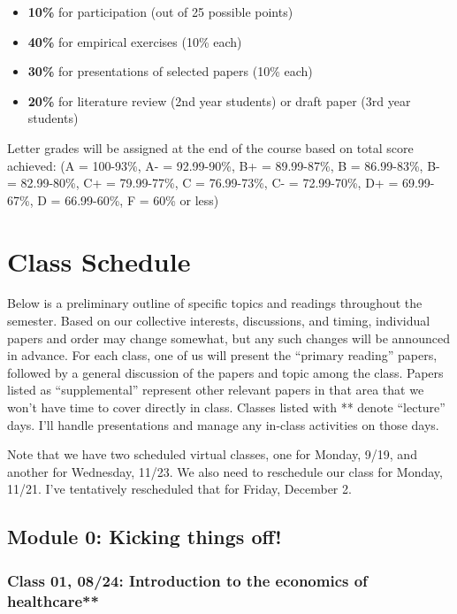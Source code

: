 \documentclass[11pt,]{article}
\begin{document}
\begin{itemize}
\item
  \textbf{10\%} for participation (out of 25 possible points)
\item
  \textbf{40\%} for empirical exercises (10\% each)
\item
  \textbf{30\%} for presentations of selected papers (10\% each)
\item
  \textbf{20\%} for literature review (2nd year students) or draft paper
  (3rd year students)
\end{itemize}

Letter grades will be assigned at the end of the course based on total
score achieved: (A = 100-93\%, A- = 92.99-90\%, B+ = 89.99-87\%, B =
86.99-83\%, B- = 82.99-80\%, C+ = 79.99-77\%, C = 76.99-73\%, C- =
72.99-70\%, D+ = 69.99-67\%, D = 66.99-60\%, F = 60\% or less)

\newpage

\hypertarget{class-schedule}{%
\section{Class Schedule}\label{class-schedule}}

Below is a preliminary outline of specific topics and readings
throughout the semester. Based on our collective interests, discussions,
and timing, individual papers and order may change somewhat, but any
such changes will be announced in advance. For each class, one of us
will present the ``primary reading'' papers, followed by a general
discussion of the papers and topic among the class. Papers listed as
``supplemental'' represent other relevant papers in that area that we
won't have time to cover directly in class. Classes listed with **
denote ``lecture'' days. I'll handle presentations and manage any
in-class activities on those days.

Note that we have two scheduled virtual classes, one for Monday, 9/19,
and another for Wednesday, 11/23. We also need to reschedule our class
for Monday, 11/21. I've tentatively rescheduled that for Friday,
December 2.

\hypertarget{module-0-kicking-things-off}{%
\subsection{Module 0: Kicking things
off!}\label{module-0-kicking-things-off}}

\hypertarget{class-01-0824-introduction-to-the-economics-of-healthcare}{%
\subsubsection{Class 01, 08/24: Introduction to the economics of
healthcare**}\label{class-01-0824-introduction-to-the-economics-of-healthcare}}
\end{document}
